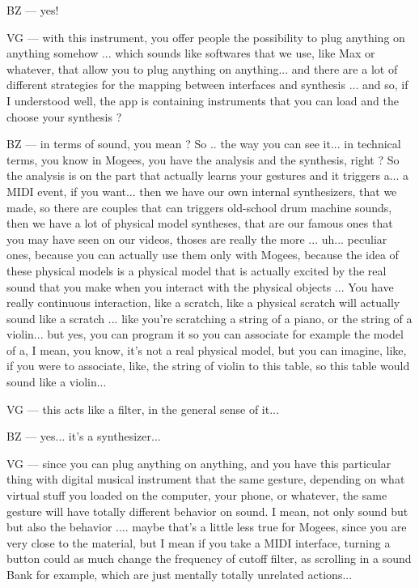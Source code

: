 BZ — yes!

VG — with this instrument, you offer people the possibility to plug anything on anything somehow ... which sounds like softwares that we use, like Max or whatever, that allow you to plug anything on anything... and there are a lot of different strategies for the mapping between interfaces and synthesis ... and so, if I understood well, the app is containing instruments that you can load and the choose your synthesis ?

BZ — in terms of sound, you mean ? So .. the way you can see it... in technical terms, you know in Mogees, you have the analysis and the synthesis, right ? So the analysis is on the part that actually learns your gestures and it triggers a... a MIDI event, if you want... then we have our own internal synthesizers, that we made, so there are couples that can triggers old-school drum machine sounds, then we have a lot of physical model syntheses, that are our famous ones that you may have seen on our videos, thoses are really the more ... uh... peculiar ones, because you can actually use them only with Mogees, because the idea of these physical models is a physical model that is actually excited by the real sound that you make when you interact with the physical objects ... You have really continuous interaction, like a scratch, like a physical scratch will actually sound like a scratch ... like you're scratching a string of a piano, or the string of a violin... but yes, you can program it so you can associate for example the model of a, I mean, you know, it's not a real physical model, but you can imagine, like, if you were to associate, like, the string of violin to this table, so this table would sound like a violin... 

VG — this acts like a filter, in the general sense of it...

BZ — yes... it's a synthesizer... 
 
VG — since you can plug anything on anything, and you have this particular thing with digital musical instrument that the same gesture, depending on what virtual stuff you loaded on the computer, your phone, or whatever, the same gesture will have totally different behavior on sound. I mean, not only sound but but also the behavior .... maybe that's a little less true for Mogees, since you are very close to the material, but I mean if you take a MIDI interface, turning a button could as much change the frequency of cutoff filter, as scrolling in a sound Bank for example, which are just mentally totally unrelated actions...

